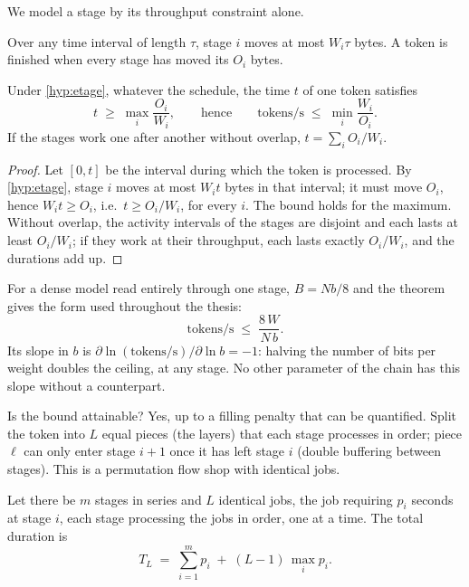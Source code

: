 We model a stage by its throughput constraint alone.

\begin{hypothese}\label{hyp:etage}
Over any time interval of length $\tau$, stage $i$ moves at most $W_i \tau$ bytes. A token is finished when every stage has moved its $O_i$ bytes.
\end{hypothese}

\begin{theoreme}\label{thm:toit}
Under \cref{hyp:etage}, whatever the schedule, the time $t$ of one token satisfies
\begin{equation}\label{eq:toit}
t \;\ge\; \max_i \frac{O_i}{W_i}, \qquad \text{hence} \qquad \text{tokens/s} \;\le\; \min_i \frac{W_i}{O_i}.
\end{equation}
If the stages work one after another without overlap, $t = \sum_i O_i / W_i$.
\end{theoreme}

\begin{proof}
Let $[0, t]$ be the interval during which the token is processed. By \cref{hyp:etage}, stage $i$ moves at most $W_i t$ bytes in that interval; it must move $O_i$, hence $W_i t \ge O_i$, i.e.\ $t \ge O_i/W_i$, for every $i$. The bound holds for the maximum. Without overlap, the activity intervals of the stages are disjoint and each lasts at least $O_i/W_i$; if they work at their throughput, each lasts exactly $O_i/W_i$, and the durations add up.
\end{proof}

For a dense model read entirely through one stage, $B = N b / 8$ and the theorem gives the form used throughout the thesis:
\begin{equation}\label{eq:toit-dense}
\text{tokens/s} \;\le\; \frac{8\, W}{N\, b}.
\end{equation}
Its slope in $b$ is $\partial \ln(\text{tokens/s}) / \partial \ln b = -1$: halving the number of bits per weight doubles the ceiling, at any stage. No other parameter of the chain has this slope without a counterpart.

Is the bound attainable? Yes, up to a filling penalty that can be quantified. Split the token into $L$ equal pieces (the layers) that each stage processes in order; piece $\ell$ can only enter stage $i+1$ once it has left stage $i$ (double buffering between stages). This is a permutation flow shop with identical jobs.

\begin{lemme}\label{lem:flowshop}
Let there be $m$ stages in series and $L$ identical jobs, the job requiring $p_i$ seconds at stage $i$, each stage processing the jobs in order, one at a time. The total duration is
\begin{equation}\label{eq:flowshop}
T_L \;=\; \sum_{i=1}^{m} p_i \;+\; (L - 1)\, \max_i p_i .
\end{equation}
\end{lemme}

